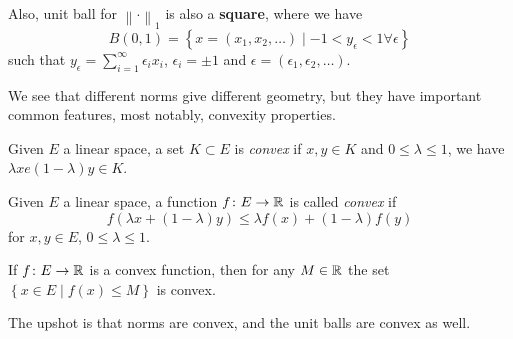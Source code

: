 Also, unit ball for \(\left\lVert \cdot\right\rVert _1\) is also a \textbf{square}, where we have
\[
	B(0, 1) = \left\{ x = (x_1, x_2, \ldots)\mid -1 < y_{\epsilon } < 1 \forall \epsilon\right\}
\]
such that \(y_{\epsilon } = \sum_{i=1}^{\infty} \epsilon _i x_i \), \(\epsilon _i = \pm 1\) and \(\epsilon = (\epsilon _1, \epsilon _2, \ldots  )\).

We see that different norms give different geometry, but they have important common features, most notably, convexity properties.

\begin{definition}
	Given \(E\) a linear space, a set \(K\subset E\) is \emph{convex} if \(x, y\in K\) and \(0 \leq \lambda \leq 1\), we have \(\lambda x e (1 - \lambda )y\in K\).
\end{definition}

\begin{definition}
	Given \(E\) a linear space, a function \(f\colon E\to \mathbb{\MakeUppercase{r}} \) is called \emph{convex} if
	\[
		f(\lambda x + (1 - \lambda )y) \leq \lambda f(x) + (1 - \lambda )f(y)
	\]
	for \(x, y\in E\), \(0 \leq \lambda \leq 1\).
\end{definition}

\begin{remark}
	If \(f\colon E \to \mathbb{\MakeUppercase{r}} \) is a convex function, then for any \(M\in \mathbb{\MakeUppercase{r}} \) the set \(\left\{ x\in E\mid f(x) \leq M \right\} \) is convex.
\end{remark}

The upshot is that norms are convex, and the unit balls are convex as well.
